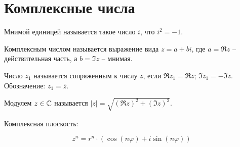 \documentclass[12pt]{article}
\begin{document}
    \section{Комплексные числа}
    \begin{definition}
        Мнимой единицей называется такое число $i$, что $i^2=-1$.
    \end{definition}
    \begin{definition}
        Комплексным числом называется выражение вида $z=a+bi$, где $a=\Re z$ – действительная часть, а $b=\Im z$ – мнимая.
    \end{definition}
    \begin{definition}
        Число $z_1$ называется сопряженным к числу $z$, если $\Re z_1=\Re z;\,\Im z_1=-\Im z$. Обозначение: $z_1=\bar{z}$.
    \end{definition}
    \begin{definition}
        Модулем $z\in \mathbb{C}$ называется $|z|=\sqrt{(\Re z)^2+(\Im z)^2}$.
    \end{definition}
    \begin{definition}
        Комплексная плоскость:
        \begin{center}
        \end{center}
    \end{definition}
    \begin{theorem}
        $$z^n=r^n\cdot(\cos(n\varphi)+i\sin(n\varphi))$$
    \end{theorem}
\end{document}

